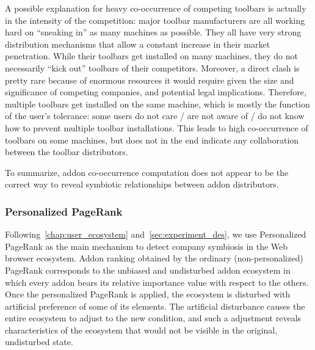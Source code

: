 \documentclass[11pt,oneside]{book}
\let\Oldsubsubsection\subsubsection
\renewcommand{\subsubsection}{\FloatBarrier\Oldsubsubsection}
\begin{document}
A possible explanation for heavy co-occurrence of competing toolbars is actually in the intensity of the competition: major toolbar manufacturers are all working hard on ``sneaking in'' as many machines as possible. They all have very strong distribution mechanisms that allow a constant increase in their market penetration. While their toolbars get installed on many machines, they do not necessarily ``kick out'' toolbars of their competitors. Moreover, a direct clash is pretty rare because of enormous resources it would require given the size and significance of competing companies, and potential legal implications. Therefore, multiple toolbars get installed on the same machine, which is mostly the function of the user's tolerance: some users do not care / are not aware of / do not know how to prevent multiple toolbar installations. This leads to high co-occurrence of toolbars on some machines, but does not in the end indicate any collaboration between the toolbar distributors.

To summarize, addon co-occurrence computation does not appear to be the correct way to reveal symbiotic relationships between addon distributors.

\subsubsection{Personalized PageRank}

Following~\autoref{chap:user_ecosystem} and~\autoref{sec:experiment_des}, we use Personalized PageRank as the main mechanism to detect company symbiosis in the Web browser ecosystem. Addon ranking obtained by the ordinary (non-personalized) PageRank corresponds to the unbiased and undisturbed addon ecosystem in which every addon bears its relative importance value with respect to the others. Once the personalized PageRank is applied, the ecosystem is disturbed with artificial preference of some of its elements. The artificial disturbance causes the entire ecosystem to adjust to the new condition, and such a adjustment reveals characteristics of the ecosystem that would not be visible in the original, undisturbed state. 
\end{document}
